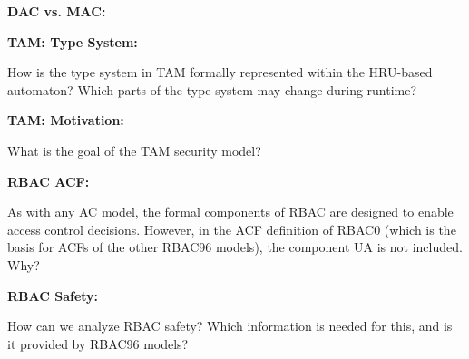 \documentclass[10pt]{exam}  %
\begin{document}
\begin{questions}
    \question \textbf{DAC vs. MAC:}\hfill
    \begin{solution}
    \end{solution}

    \question \textbf{TAM: Type System:}\hfill

    How is the type system in TAM formally represented within the HRU-based automaton? Which parts of the type system may change during runtime?
    \begin{solution}
    \end{solution}

    \question \textbf{TAM: Motivation:}\hfill

    What is the goal of the TAM security model?
    \begin{solution}
    \end{solution}

    \question \textbf{RBAC ACF:}\hfill

    As with any AC model, the formal components of RBAC are designed to enable access control decisions. However, in the ACF definition of RBAC0 (which is the basis for ACFs of the other RBAC96 models), the component UA is not included. Why?
    \begin{solution}
    \end{solution}

    \question \textbf{RBAC Safety:}\hfill

    How can we analyze RBAC safety? Which information is needed for this, and is it provided by RBAC96 models?
    \begin{solution}
    \end{solution}


\end{questions}
\end{document}
